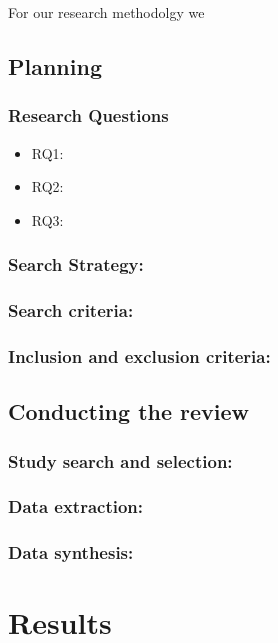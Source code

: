 \documentclass[sigconf]{acmart}
\begin{document}
For our research methodolgy we ~\cite{Stuart2007-cc}

\subsection{Planning}

\subsubsection{Research Questions}

\begin{itemize}
    \item RQ1:
    \item RQ2:
    \item RQ3:
\end{itemize}

\subsubsection{Search Strategy:}

\subsubsection{Search criteria:}

\subsubsection{Inclusion and exclusion criteria:}

\subsection{Conducting the review}

\subsubsection{Study search and selection:}

\subsubsection{Data extraction:}

\subsubsection{Data synthesis:}


\section{Results}
\end{document}
